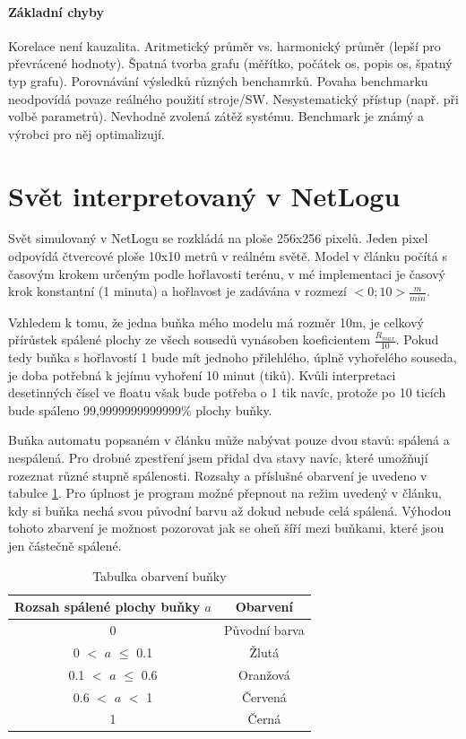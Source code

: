 \documentclass[11pt,a4paper]{scrartcl}
\begin{document}
	
	\paragraph{Základní chyby} Korelace není kauzalita. Aritmetický průměr vs. harmonický průměr (lepší pro převrácené hodnoty). Špatná tvorba grafu (měřítko, počátek os, popis os, špatný typ grafu). Porovnávání výsledků různých benchamrků. Povaha benchmarku neodpovídá povaze reálného použití stroje/SW. Nesystematický přístup (např. při volbě parametrů). Nevhodně zvolená zátěž systému. Benchmark je známý a výrobci pro něj optimalizují.
	
	\section{Svět interpretovaný v NetLogu}
	Svět simulovaný v NetLogu se rozkládá na ploše 256x256 pixelů. Jeden pixel odpovídá čtvercové ploše 10x10 metrů v reálném světě. Model v článku počítá s časovým krokem určeným podle hořlavosti terénu, v mé implementaci je časový krok konstantní (1 minuta) a hořlavost je zadávána v rozmezí $<0;10> \frac{m}{min}$. 
	
	Vzhledem k tomu, že jedna buňka mého modelu má rozměr 10m, je celkový přírůstek spálené plochy ze všech sousedů vynásoben koeficientem $\frac{R_{max}}{10}$. Pokud tedy buňka s hořlavostí 1 bude mít jednoho přilehlého, úplně vyhořelého souseda, je doba potřebná k jejímu vyhoření 10 minut (tiků). Kvůli interpretaci desetinných čísel ve floatu však bude potřeba o 1 tik navíc, protože po 10 ticích bude spáleno 99,9999999999999\% plochy buňky.
	
	Buňka automatu popsaném v článku může nabývat pouze dvou stavů: spálená a nespálená. Pro drobné zpestření jsem přidal dva stavy navíc, které umožňují rozeznat různé stupně spálenosti. Rozsahy a příslušné obarvení je uvedeno v tabulce \ref{tab:patch-color}. Pro úplnost je program možné přepnout na režim uvedený v článku, kdy si buňka nechá svou původní barvu až dokud nebude celá spálená. Výhodou tohoto zbarvení je možnost pozorovat jak se oheň šíří mezi buňkami, které jsou jen částečně spálené.
	
	\begin{table}[H]
		\centering
		\begin{tabular}{|c|c|}
			\hline
			Rozsah spálené plochy buňky $a$ & Obarvení \\
			\hline
			\hline
			0 & Původní barva \\
			\hline
			0 $<$ $a$ $\le$ 0.1 & Žlutá \\
			\hline
			0.1 $<$ $a$ $\le$ 0.6 & Oranžová \\
			\hline
			0.6 $<$ $a$ $<$ 1 & Červená \\
			\hline
			1 & Černá \\
			\hline 
		\end{tabular}
		\caption{Tabulka obarvení buňky}
		\label{tab:patch-color}
	\end{table}
	
\end{document}
